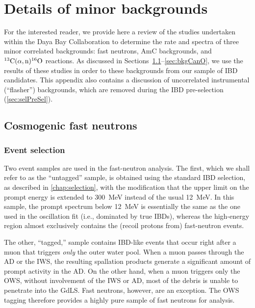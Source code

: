 \documentclass[../thesis.tex]{subfiles}
\begin{document}
\chapter{Details of minor backgrounds}
\label{chap:bkgDetails}

For the interested reader, we provide here a review of the studies undertaken within the Daya Bay Collaboration to determine the rate and spectra of three minor correlated backgrounds: fast neutrons, AmC backgrounds, and $^{13}\mathrm{C}(\alpha, \mathrm{n})^{16}\mathrm{O}$ reactions. As discussed in Sections~\ref{sec:bkgFastn}--\ref{sec:bkgCanO}, we use the results of these studies in order to these backgrounds from our sample of IBD candidates. This appendix also contains a discussion of uncorrelated instrumental (``flasher'') backgrounds, which are removed during the IBD pre-selection (\autoref{sec:selPreSel}).

\section{Cosmogenic fast neutrons}
\label{sec:bkgFastn}

\subsection{Event selection}
\label{sec:fastn_sel}

Two event samples are used in the fast-neutron analysis. The first, which we shall refer to as the ``untagged'' sample, is obtained using the standard IBD selection, as described in \autoref{chap:selection}, with the modification that the upper limit on the prompt energy is extended to 300~MeV instead of the usual 12~MeV. In this sample, the prompt spectrum below 12~MeV is essentially the same as the one used in the oscillation fit (i.e., dominated by true IBDs), whereas the high-energy region almost exclusively contains the (recoil protons from) fast-neutron events.

The other, ``tagged,'' sample contains IBD-like events that occur right after a muon that triggers \emph{only} the outer water pool. When a muon passes through the AD or the IWS, the resulting spallation products generate a significant amount of prompt activity in the AD. On the other hand, when a muon triggers only the OWS, without involvement of the IWS or AD, most of the debris is unable to penetrate into the GdLS. Fast neutrons, however, are an exception. The OWS tagging therefore provides a highly pure sample of fast neutrons for analysis.
\end{document}
